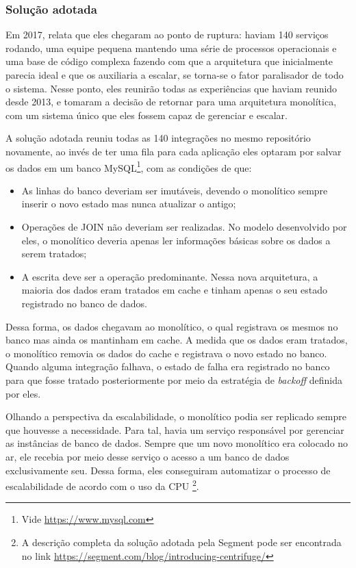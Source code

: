 \subsubsection{Solução adotada}

Em 2017,  relata que eles chegaram ao ponto de
ruptura: haviam 140 serviços rodando, uma equipe pequena mantendo uma série de processos
operacionais e uma base de código complexa fazendo com que a arquitetura que inicialmente parecia
ideal e que os auxiliaria a escalar, se torna-se o fator paralisador de todo o sistema. Nesse ponto,
eles reunirão todas as experiências que haviam reunido desde 2013, e tomaram a decisão de retornar
para uma arquitetura monolítica, com um sistema único que eles fossem capaz de gerenciar e escalar.

A solução adotada reuniu todas as 140 integrações no mesmo repositório novamente, ao invés de ter
uma fila para cada aplicação eles optaram por salvar os dados em um banco MySQL\footnote{Vide
\url{https://www.mysql.com}}, com as condições de que:

\begin{itemize}
    \item As linhas do banco deveriam ser imutáveis, devendo o monolítico sempre inserir o novo
        estado mas nunca atualizar o antigo;
    \item Operações de JOIN não deveriam ser realizadas. No modelo desenvolvido por eles, o
        monolítico deveria apenas ler informações básicas sobre os dados a serem tratados;
    \item A escrita deve ser a operação predominante. Nessa nova arquitetura, a maioria dos dados
        eram tratados em cache e tinham apenas o seu estado registrado no banco de dados.
\end{itemize}

Dessa forma, os dados chegavam ao monolítico, o qual registrava os mesmos no banco mas ainda os
mantinham em cache. A medida que os dados eram tratados, o monolítico removia os dados do cache e
registrava o novo estado no banco. Quando alguma integração falhava, o estado de falha era
registrado no banco para que fosse tratado posteriormente por meio da estratégia de \textit{backoff}
definida por eles.

Olhando a perspectiva da escalabilidade, o monolítico podia ser replicado sempre que houvesse a
necessidade. Para tal, havia um serviço responsável por gerenciar as instâncias de banco de dados.
Sempre que um novo monolítico era colocado no ar, ele recebia por meio desse serviço o acesso a um
banco de dados exclusivamente seu. Dessa forma, eles conseguiram automatizar o processo de
escalabilidade de acordo com o uso da CPU \cite{Segment2018:Centrifuge}\footnote{A descrição
completa da solução adotada pela Segment pode ser encontrada no link \url{https://segment.com/blog/introducing-centrifuge/}}.

